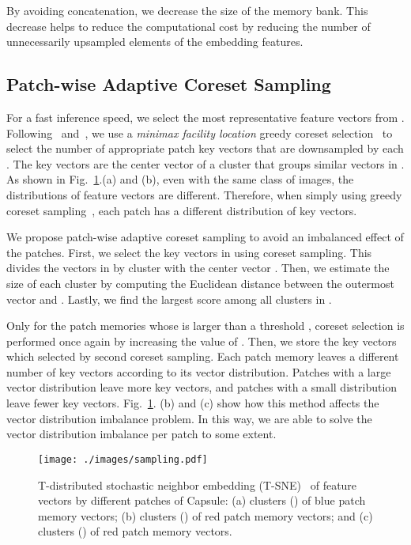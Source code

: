 \documentclass{article}
\begin{document}
By avoiding concatenation, we decrease the size of the memory bank. This decrease helps to reduce the computational cost by reducing the number of unnecessarily upsampled elements of the embedding features.
 
	
 \vspace{-0.4cm}
	\subsection{Patch-wise Adaptive Coreset Sampling}
	\vspace{-0.2cm}
	For a fast inference speed, we select the most representative feature vectors from . Following~\cite{coreset1,coreset2} and~\cite{patchcore}, we use a \textit{minimax facility location} greedy coreset selection~\cite{coreset1} to select the number of  appropriate patch key vectors  that are downsampled by each . The key vectors  are the center vector of a cluster that groups similar vectors in . As shown in Fig.~\ref{patchvectors}.(a) and (b), even with the same class of images, the distributions of feature vectors are different. Therefore, when simply using greedy coreset sampling~\cite{core}, each patch has a different distribution of key vectors.  


  We propose patch-wise adaptive coreset sampling to avoid an imbalanced effect of the patches. First, we select the key vectors  in  using coreset sampling. This divides the vectors in  by cluster with the center vector . Then, we estimate the size of each cluster by computing the Euclidean distance   between the outermost vector  and . Lastly, we find the largest score  among all clusters in .
  \vspace{-0.2cm}
 
 Only for the patch memories  whose  is larger than a threshold , coreset selection is performed once again by increasing the value of . Then, we store the key vectors which selected by second coreset sampling. Each patch memory leaves a different number of key vectors  according to its vector distribution. Patches with a large vector distribution leave more key vectors, and patches with a small distribution leave fewer key vectors. Fig.~\ref{patchvectors}. (b) and (c) show how this method affects the vector distribution imbalance problem. In this way, we are able to solve the vector distribution imbalance per patch to some extent.


\begin{figure}[t]
	\centering
	\texttt{[image: ./images/sampling.pdf]}
	\vspace{-0.9cm}
	\caption{T-distributed stochastic neighbor embedding (T-SNE)~\cite{TSNE} of feature vectors by different patches of Capsule: (a) clusters () of blue patch memory vectors; (b) clusters () of red patch memory vectors; and (c) clusters () of red patch memory vectors.
}
	\vspace{-0.1cm}

	\label{patchvectors}
    \end{figure}
\end{document}
